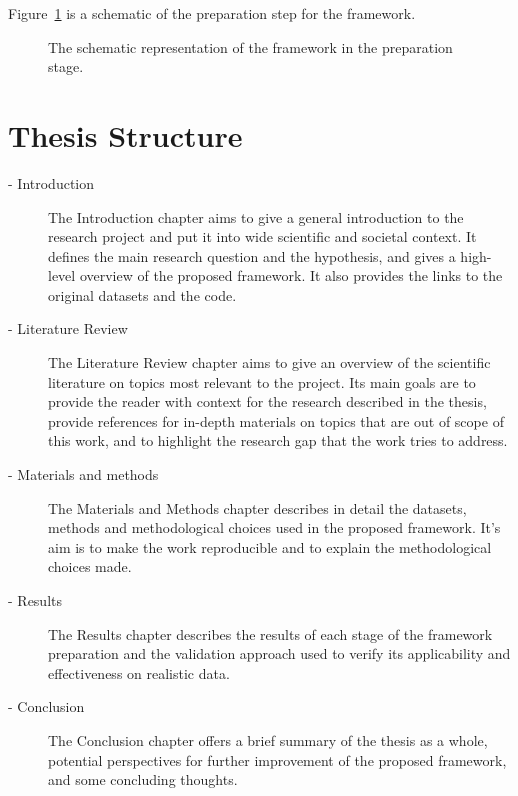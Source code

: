 Figure~\ref{fig-framework-prepare} is a schematic of the preparation
step for the framework.

\begin{figure}
\caption{\label{fig-framework-prepare}The schematic representation of
the framework in the preparation stage.}
\end{figure}

\section{Thesis Structure}

\begin{description}
    \item[ - Introduction]
The Introduction chapter aims to give a general introduction to the research project and put it into wide scientific and societal context.
It defines the main research question and the hypothesis, and gives a high-level overview of the proposed framework.
It also provides the links to the original datasets and the code.

    \item[ - Literature Review]
The Literature Review chapter aims to give an overview of the scientific literature on topics most relevant to the project.
Its main goals are to provide the reader with context for the research described in the thesis, provide references for in-depth materials on topics that are out of scope of this work, and to highlight the research gap that the work tries to address.

	\item[ - Materials and methods]
The Materials and Methods chapter describes in detail the datasets, methods and methodological choices used in the proposed framework.
It's aim is to make the work reproducible and to explain the methodological choices made.

	\item[ - Results]
The Results chapter describes the results of each stage of the framework preparation and the validation approach used to verify its applicability and effectiveness on realistic data.

    \item[ - Conclusion]
The Conclusion chapter offers a brief summary of the thesis as a whole, potential perspectives for further improvement of the proposed framework, and some concluding thoughts.

\end{description}

